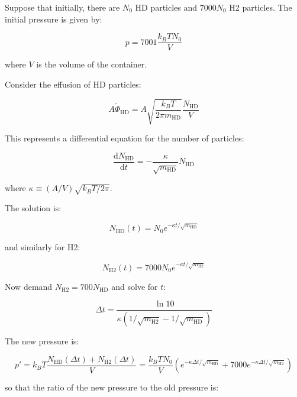 \documentclass[12pt]{article}
\begin{document}
Suppose that initially, there are $N_{0}$ HD particles and $7000N_{0}$ H2 particles. The initial pressure is given by:

\begin{equation}
    p = 7001 \frac{k_{B}TN_{0}}{V}
\end{equation}

where $V$ is the volume of the container.

Consider the effusion of HD particles:

\begin{equation}
    A\tilde{\Phi}_{\text{HD}} = A\sqrt{\frac{k_{B}T}{2\pi m_{\text{HD}}}} \frac{N_{\text{HD}}}{V}
\end{equation}

This represents a differential equation for the number of particles:

\begin{equation}
    \frac{\mathrm{d}N_{\text{HD}}}{\mathrm{d}t} = -\frac{\kappa}{\sqrt{m_{\text{HD}}}} N_{\text{HD}}
\end{equation}

where $\kappa \equiv (A/V) \sqrt{k_{B}T/2\pi}$.

The solution is:

\begin{equation}
    N_{\text{HD}}(t) = N_{0} e^{-\kappa t/\sqrt{m_{\text{HD}}}}
\end{equation}

and similarly for H2:

\begin{equation}
    N_{\text{H2}}(t) = 7000N_{0} e^{-\kappa t/\sqrt{m_{\text{H2}}}}
\end{equation}

Now demand $N_{\text{H2}} = 700N_{\text{HD}}$ and solve for $t$:

\begin{equation}
    \Delta t = \frac{\ln{10}}{\kappa(1/\sqrt{m_{\text{H2}}} - 1/\sqrt{m_{\text{HD}}})}
\end{equation}

The new pressure is:

\begin{equation}
    p' = k_{B}T \frac{N_{\text{HD}}(\Delta t) + N_{\text{H2}}(\Delta t)}{V} = \frac{k_{B}TN_{0}}{V} \left( e^{-\kappa \Delta t/\sqrt{m_{\text{HD}}}} + 7000 e^{-\kappa \Delta t/\sqrt{m_{\text{H2}}}} \right)
\end{equation}

so that the ratio of the new pressure to the old pressure is:
\end{document}
